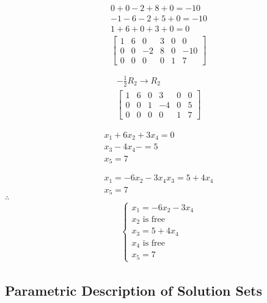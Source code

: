 \documentclass[12pt letter]{report}
\begin{document}
{{    \begin{align*}
      \begin{split}
        0 + 0 -2 + 8 + 0 = -10 \\
        -1 -6 -2 + 5 + 0 = -10 \\
        \hline
        1 + 6 + 0 + 3 + 0 = 0
      \end{split}
    \end{align*}
    \[
      \begin{bmatrix}
        1 & 6 & 0  & 3 & 0 & 0   \\
        0 & 0 & -2 & 8 & 0 & -10 \\
        0 & 0 & 0  & 0 & 1 & 7
      \end{bmatrix}
    \]

    \begin{align*}
      -\frac{1}{2}R_2 \to R_2 \\
      \begin{bmatrix}
        1 & 6 & 0 & 3  & 0 & 0 \\
        0 & 0 & 1 & -4 & 0 & 5 \\
        0 & 0 & 0 & 0  & 1 & 7
      \end{bmatrix}
    \end{align*}

    \begin{align*}
      x_1 + 6x_2  +3x_4 = 0 \\
      x_3 - 4x_4 -  = 5     \\
      x_5 = 7               \\
      \\
      \\
      x_1 = -6x_2 - 3x_4
      x_3 =  5 + 4x_4       \\
      x_5 = 7
    \end{align*}
    $\therefore$
    \begin{align*}
      \begin{cases}
        x_1 = -6x_2 - 3x_4   \\
        x_2 \text{ is free } \\
        x_3 =  5 + 4x_4      \\
        x_4 \text{ is free}  \\
        x_5 = 7
      \end{cases}
    \end{align*}
  }
}

\subsection{Parametric Description of Solution Sets}
\end{document}
